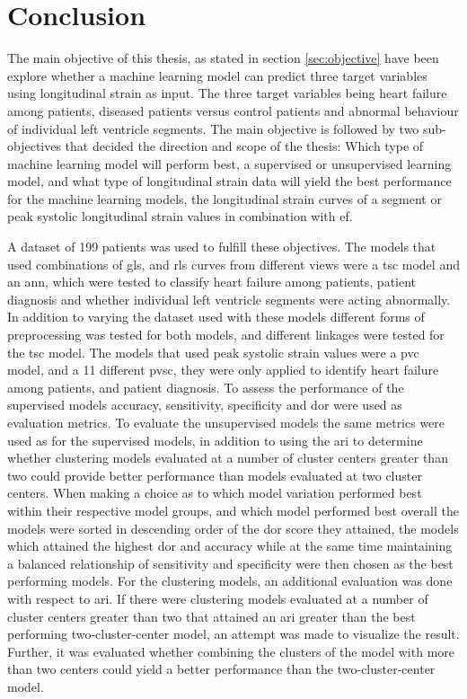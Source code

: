 \chapter{Conclusion} \label{chap:conclusion}

The main objective of this thesis, as stated in section \ref{sec:objective} have been explore whether a machine learning model can predict three target variables using longitudinal strain as input. The three target variables being heart failure among patients, diseased patients versus control patients and abnormal behaviour of individual left ventricle segments. The main objective is followed by two sub-objectives that decided the direction and scope of the thesis: Which type of machine learning model will perform best, a supervised or unsupervised learning model, and what type of longitudinal strain data will yield the best performance for the machine learning models, the longitudinal strain curves of a segment or peak systolic longitudinal strain values in combination with \acrshort{ef}. \bigskip

A dataset of 199 patients was used to fulfill these objectives. The models that used combinations of \acrshort{gls}, and \acrshort{rls} curves from different views were a \acrshort{tsc} model and an \acrshort{ann}, which were tested to classify heart failure among patients, patient diagnosis and whether individual left ventricle segments were acting abnormally. In addition to varying the dataset used with these models different forms of preprocessing was tested for both models, and different linkages were tested for the \acrshort{tsc} model. The models that used peak systolic strain values were a \acrshort{pvc} model, and a 11 different \acrshort{pvsc}, they were only applied to identify heart failure among patients, and patient diagnosis. To assess the performance of the supervised models accuracy, sensitivity, specificity and \acrshort{dor} were used as evaluation metrics. To evaluate the unsupervised models the same metrics were used as for the supervised models, in addition to using the \acrshort{ari} to determine whether clustering models evaluated at a number of cluster centers greater than two could provide better performance than models evaluated at two cluster centers. When making a choice as to which model variation performed best within their respective model groups, and which model performed best overall the models were sorted in descending order of the \acrshort{dor} score they attained, the models which attained the highest \acrshort{dor} and accuracy while at the same time maintaining a balanced relationship of sensitivity and specificity were then chosen as the best performing models. For the clustering models, an additional evaluation was done with respect to \acrshort{ari}. If there were clustering models evaluated at a number of cluster centers greater than two that attained an \acrshort{ari} greater than the best performing two-cluster-center model, an attempt was made to visualize the result. Further, it was evaluated whether combining the clusters of the model with more than two centers could yield a better performance than the two-cluster-center model. \bigskip

